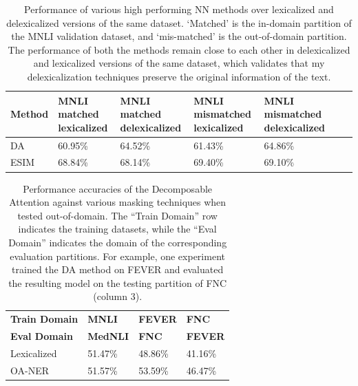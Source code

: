 \documentclass[compsoc,onecolumn]{IEEEtran}
\begin{document}
\begin{table}[h]
\begin{center}
\begin{tabular}{|p{20mm}|p{20mm}|p{20mm}|p{20mm}|p{20mm}|p{20mm}|p{20mm}|}
\hline 
\textbf{Method} & \textbf{MNLI matched lexicalized }& \textbf{MNLI matched delexicalized } & \textbf{MNLI mismatched lexicalized } &\textbf{MNLI mismatched delexicalized } \\
 \hline
DA & {60.95\%} &{64.52\%} &{61.43\%}&{64.86\%}\\
\hline 
ESIM  & {68.84\%} &{68.14\%} &{69.40\%}&{69.10\%}\\
\hline 
\end{tabular}
\end{center}
\caption{Performance of various high performing NN methods over lexicalized and delexicalized versions of the same dataset. `Matched' is the in-domain partition of the MNLI validation dataset, and `mis-matched' is the out-of-domain partition. The performance of both the methods remain close to each other in delexicalized and lexicalized versions of the same dataset, which validates that my  delexicalization techniques preserve the original information of the text. }

    \label{results}
\end{table}



\begin{table}[h]
\begin{center}
\begin{tabular}{|p{25mm}|p{12mm}|p{11mm}|p{10mm}|}
 \hline
\textbf{Train Domain} & \textbf{MNLI}& \textbf{FEVER}   & \textbf{FNC} \\ 
 \textbf{Eval Domain} & \textbf{MedNLI}& \textbf{{FNC}}   & \textbf{{FEVER}} \\ 
\hline
Lexicalized &51.47\%& {48.86\%} & {41.16\%} \\
OA-NER &51.57\%& 53.59\% & {46.47\%}\\
\hline
\end{tabular}
\end{center}
    \caption{ Performance accuracies of the Decomposable Attention against various masking techniques when tested out-of-domain. The ``Train Domain'' row indicates the training datasets, while the ``Eval Domain'' indicates the domain of the corresponding evaluation partitions. For example, one experiment trained the DA method on FEVER and evaluated the resulting model on the testing partition of FNC (column 3). }
    
    \label{results_outofdomain}
\end{table}
\end{document}

